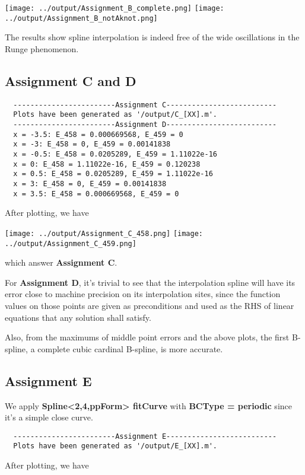 \documentclass{article}
\begin{document}
\texttt{[image: ../output/Assignment\_B\_complete.png]}
\texttt{[image: ../output/Assignment\_B\_notAknot.png]}

The results show spline interpolation is indeed free of the wide oscillations in the Runge phenomenon.

\subsection*{\textbf{Assignment C and D}}
\lstset{language=C++}
\begin{lstlisting}
  ------------------------Assignment C--------------------------
  Plots have been generated as '/output/C_[XX].m'.
  ------------------------Assignment D--------------------------
  x = -3.5: E_458 = 0.000669568, E_459 = 0
  x = -3: E_458 = 0, E_459 = 0.00141838
  x = -0.5: E_458 = 0.0205289, E_459 = 1.11022e-16
  x = 0: E_458 = 1.11022e-16, E_459 = 0.120238
  x = 0.5: E_458 = 0.0205289, E_459 = 1.11022e-16
  x = 3: E_458 = 0, E_459 = 0.00141838
  x = 3.5: E_458 = 0.000669568, E_459 = 0
\end{lstlisting}
After plotting, we have

\texttt{[image: ../output/Assignment\_C\_458.png]}
\texttt{[image: ../output/Assignment\_C\_459.png]}

which answer \textbf{Assignment C}.

For \textbf{Assignment D}, it's trivial to see that the interpolation spline will have 
its error close to machine precision on its interpolation sites, since the function values 
on those points are given as preconditions and used as the RHS of linear equations that any 
solution shall satisfy. 

Also, from the maximums of middle point errors and the above plots, the first B-spline, a complete cubic 
cardinal B-spline, is more accurate.

\subsection{\textbf{Assignment E}}
\lstset{language=C++}
We apply \textbf{Spline<2,4,ppForm> fitCurve} with \textbf{BCType = periodic} since it's 
a simple close curve. 
\begin{lstlisting}
  ------------------------Assignment E--------------------------
  Plots have been generated as '/output/E_[XX].m'.
\end{lstlisting}
After plotting, we have
\end{document}
